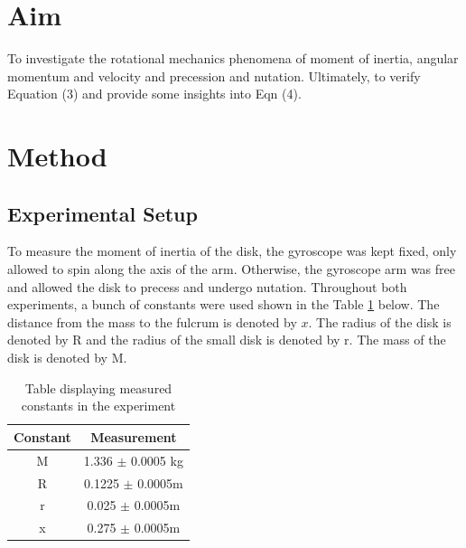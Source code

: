 \documentclass{article}
\begin{document}
\section{Aim}
To investigate the rotational mechanics phenomena of  moment of inertia, 
angular momentum and velocity and precession and nutation. 
Ultimately, to verify Equation (3) and provide some insights 
into Eqn (4).
\section{Method}
\subsection{Experimental Setup}
To measure the moment of inertia of the disk, the gyroscope was kept fixed,
only allowed to spin along the axis of the arm. Otherwise, the gyroscope
arm was free and allowed the disk to precess and undergo nutation. Throughout both 
experiments, a bunch of constants were used shown in the Table \ref{fig:table} 
below. The distance from the mass to the fulcrum is denoted by $x$. The radius 
of the disk is denoted by R and the radius of the small disk is denoted by r. 
The mass of the disk is denoted by M.

\begin{table}[H]
    \centering
    \begin{tabular}{c|c}
        Constant & Measurement \\
        \hline
        M & 1.336 $\pm$ 0.0005 kg \\
        R & 0.1225 $\pm$ 0.0005m \\
        r & 0.025 $\pm$ 0.0005m \\
        x & 0.275 $\pm$ 0.0005m 
    \end{tabular}
    \caption{Table displaying measured constants in the experiment}
    \label{fig:table}
\end{table}
\end{document}
